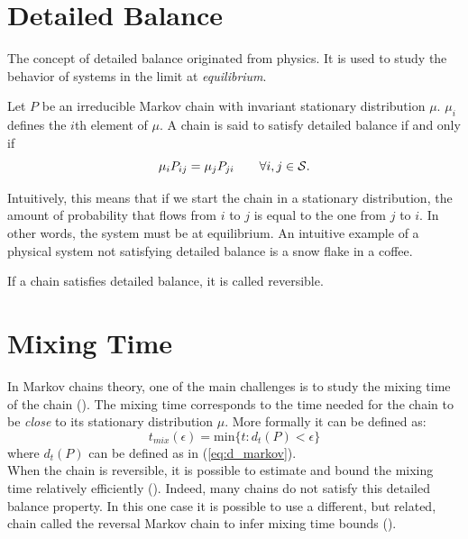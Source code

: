 \section{Detailed Balance}
The concept of detailed balance originated from physics. It is used to study the behavior of systems in the limit at \emph{equilibrium}. 
\begin{definition}
Let $P$ be an irreducible Markov chain with invariant stationary distribution $\mu$. $\mu_i$ defines the $i$th element of $\mu$. A chain is said to satisfy detailed balance if and only if
\begin{equation}
    \mu_i P_{ij} = \mu_j P_{ji} \qquad \forall i,j \in \mathcal{S}.
\end{equation}
\end{definition}
Intuitively, this means that if we start the chain in a stationary distribution, the amount of probability that flows from $i$ to $j$ is equal to the one from $j$ to $i$. In other words, the system must be at equilibrium. An intuitive example of a physical system not satisfying detailed balance is a snow flake in a coffee. 
\begin{remark}
If a chain satisfies detailed balance, it is called reversible.
\end{remark}

\section{Mixing Time}

In Markov chains theory, one of the main challenges is to study the mixing time of the chain (\cite{levin2017markov}). The mixing time corresponds to the time needed for the chain to be \emph{close} to its stationary distribution $\mu$. More formally it can be defined as:
\begin{equation}
    t_{mix}(\epsilon) = \text{min} \{ t : d_t(P) < \epsilon \}
\end{equation}
where $d_t(P)$ can be defined as in (\ref{eq:d_markov}).\\
When the chain is reversible, it is possible to estimate and bound the mixing time relatively efficiently (\cite{diaconis1991geometric,}). Indeed, many chains do not satisfy this detailed balance property. In this one case it is possible to use a different, but related, chain called the reversal Markov chain to infer mixing time bounds (\cite{fill1991eigenvalue,chung2012chernoff}).




